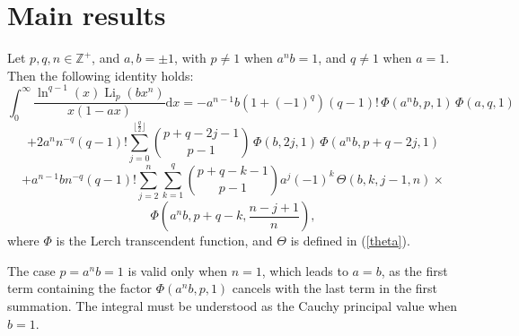 \documentclass[11pt,reqno]{article}
\begin{document}
\section{Main results}
\begin{theorem}\label{infinity integral1}
	Let $p,q,n\in\mathbb{Z}^{+}$, and $a,b=\pm1$, with $p\neq1$ when $a^nb=1$, and $q\neq1$ when $a=1$. Then the following identity holds:
	\[\int_0^\infty\frac{\ln^{q-1}(x)\operatorname{Li}_{p}(bx^{n})}{x(1-ax)}\mathrm{d} x=-a^{n-1}b(1+{(-1)}^{q})(q-1)!\,\Phi(a^nb,p,1)\,\Phi(a,q,1)\]	
	\[+2a^n n^{-q} (q-1)!\sum_{j=0}^{\lfloor\frac{q}{2}\rfloor}\binom{p+q-2j-1}{p-1}\,\Phi(b,2j,1)\,\Phi(a^nb,p+q-2j,1)\]	
	\[+a^{n-1}b n^{-q}(q-1)!\sum_{j=2}^{n}\sum_{k=1}^{q}\binom{p+q-k-1}{p-1}a^{j}{(-1)}^{k}\,\Theta(b,k,j-1,n)\times\]
	\[\Phi\left(a^nb,p+q-k,\frac{n-j+1}{n}\right),\]	where $\Phi$ is the Lerch transcendent function, and $\Theta$ is defined in (\ref{theta}). 
\end{theorem}
\begin{remark}
	The case $p=a^nb=1$ is valid only when $n=1$, which leads to $a=b$, as the first term containing the factor $\Phi(a^nb,p,1)$ cancels with the last term in the first summation. The integral must be understood as the Cauchy principal value when $b=1$.
\end{remark}
\end{document}
